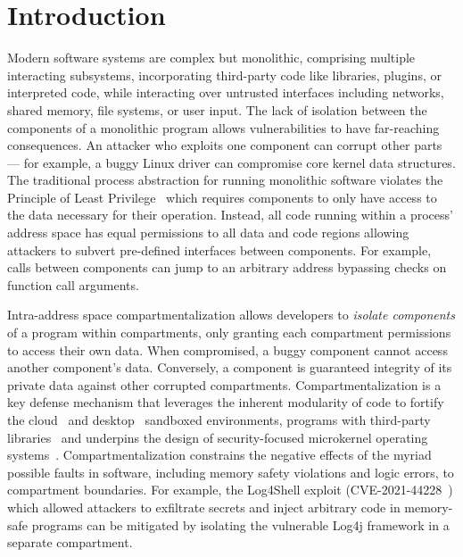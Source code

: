 \section{Introduction}

Modern software systems are complex but monolithic, 
comprising multiple interacting subsystems,
incorporating third-party code like libraries, plugins, or interpreted code,
while interacting over untrusted 
interfaces including networks, shared memory, file systems, or user input.
The lack of isolation between the components of a monolithic program 
allows vulnerabilities to have far-reaching consequences.
An attacker who exploits one component can corrupt other parts ---
for example, a buggy Linux driver can compromise
core kernel data structures.
The traditional process abstraction for running monolithic software
violates the Principle of Least Privilege~\cite{SaltzerS75}
which requires components to only have access to the data necessary
for their operation.
Instead, all code running within a process' address space has 
equal permissions to all data and code regions
allowing attackers to subvert pre-defined interfaces between components.
For example, calls between components can jump to an arbitrary address
bypassing checks on function call arguments.

Intra-address space compartmentalization allows developers to 
\emph{isolate components} of a program within compartments, 
only granting each compartment permissions to access their own data.
When compromised, a buggy component cannot access another
component's data.
Conversely, a component is guaranteed integrity of its private
data against other corrupted compartments.
Compartmentalization is a key defense mechanism that leverages the 
inherent modularity of code to 
fortify the cloud~\cite{v8isolates,ShillakerP20,miller2021} and 
desktop~\cite{fffission} sandboxed environments, 
programs with third-party libraries~\cite{GhosnKPLB21}%
and underpins the design of security-focused microkernel operating
systems~\cite{RozierAABGGHKLLN88, Hildebrand92, LevinCCPW75, GolubDFR90}.
Compartmentalization constrains the negative effects of the myriad possible faults 
in software, 
including memory safety violations and logic errors, 
to compartment boundaries.
For example, the Log4Shell exploit (CVE-2021-44228~\cite{cve202144228}) which
allowed attackers to exfiltrate secrets and inject arbitrary code in
memory-safe programs can be mitigated by isolating the vulnerable Log4j framework
in a separate compartment.

